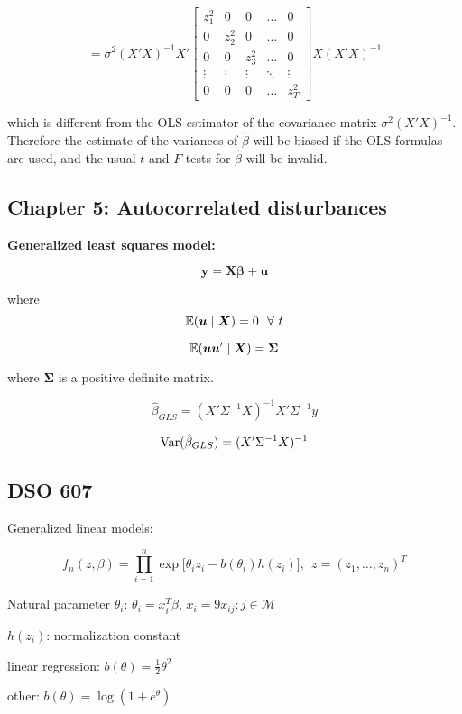 \[
= \sigma^2(X'X)^{-1}X' \begin{bmatrix}
    z_1^2 &0 & 0 & \dots & 0 \\
   0 & z_2^2 &0 & \dots  & 0 \\
   0 & 0 &  z_3^2 & \dots  & 0 \\
    \vdots & \vdots & \vdots & \ddots & \vdots \\
    0 & 0 &0 & \dots  &  z_T^2
\end{bmatrix}  X(X'X)^{-1}
\]

which is different from the OLS estimator of the covariance matrix \(\sigma^2(X'X)^{-1}\). Therefore the estimate of the variances of \(\hat{\beta}\) will be biased if the OLS formulas are used, and the usual \(t\) and \(F\) tests for \(\hat{\beta}\) will be invalid.

\subsection{Chapter 5: Autocorrelated disturbances}

\textbf{Generalized least squares model:}

\[
\boldsymbol{y} = \boldsymbol{X}\boldsymbol{\beta} + \boldsymbol{u}
\]

where
\[
\E(\boldsymbol{u} \mid \boldsymbol{X}) = 0 \ \ \forall \ t
\]

\[
\E(\boldsymbol{u} \boldsymbol{u}' \mid \boldsymbol{X}) = \boldsymbol{\Sigma} 
\]

where \(\boldsymbol{\Sigma}\) is a positive definite matrix.

\[
\hat{\beta}_{GLS} = (X' \Sigma^{-1}X)^{-1}X' \Sigma^{-1}y 
\]

\[
\Var(\hat{\beta}_{GLS}) = (X' \Sigma^{-1} X)^{-1}
\]

\subsection{DSO 607}

Generalized linear models:

\[
f_n(z, \beta) = \prod_{i=1}^n \exp \big[ \theta_i z_i - b(\theta_i) h(z_i) \big], \ \ z = (z_1, \ldots, z_n)^T
\]

Natural parameter \(\theta_i\): \(\theta_i = x_i^T \beta\), \(x_i = 9x_{ij}: j \in \mathscr{M}\)

\(h(z_i)\): normalization constant

linear regression: \(b(\theta) = \frac{1}{2} \theta^2\)

other: \(b(\theta) = \log(1 + e^{\theta})\)

